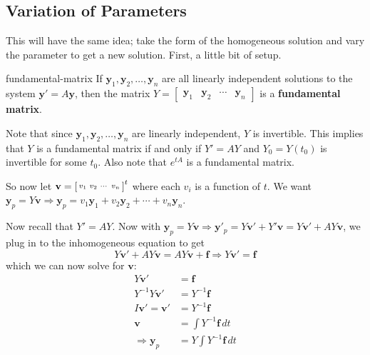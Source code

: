 \documentclass[letterpaper, 11pt, openany]{book}
\theoremstyle{mytheoremstyle}
\theoremstyle{myexamplestyle}
\begin{document}
\subsection{Variation of Parameters}
This will have the same idea; take the form of the homogeneous solution and vary the parameter to get a new solution. First, a little bit of setup.

\begin{definition}{}{fundamental-matrix}
    If \(\mathbf{y}_{1}, \mathbf{y}_{2}, \dots , \mathbf{y}_{n}\) are all linearly independent solutions to the system \(\mathbf{y}' = A \mathbf{y}\), then the matrix \(Y = \begin{bmatrix}\mathbf{y}_{1} & \mathbf{y}_{2} & \cdots & \mathbf{y}_{n} \end{bmatrix}\) is a \textbf{fundamental matrix}.
\end{definition}
Note that since \(\mathbf{y}_{1}, \mathbf{y}_{2}, \dots , \mathbf{y}_{n}\) are linearly independent, \(Y\) is invertible. This implies that \(Y\) is a fundamental matrix if and only if \(Y' = AY\) and \(Y_{0} = Y(t_{0})\) is invertible for some \(t_{0}\). Also note that \(e^{tA}\) is a fundamental matrix.

So now let \(\mathbf{v} = \begin{bsmallmatrix}
    v_{1} & v_{2} & \cdots & v_{n}
\end{bsmallmatrix}^{t}\) where each \(v_{i}\) is a function of \(t\). We want \(\mathbf{y}_{p} = Y \mathbf{v} \Rightarrow \mathbf{y}_{p} = v_{1}\mathbf{y}_{1} + v_{2}\mathbf{y}_{2} + \cdots + v_{n}\mathbf{y}_{n}\).

Now recall that \(Y' = AY\). Now with \(\mathbf{y}_{p} = Y \mathbf{v} \Rightarrow \mathbf{y}'_{p} = Y \mathbf{v}' + Y' \mathbf{v} = Y \mathbf{v}' + AY \mathbf{v}\), we plug in to the inhomogeneous equation to get
\[Y \mathbf{v}' + AY \mathbf{v} = AY \mathbf{v} + \mathbf{f} \Rightarrow Y \mathbf{v}' = \mathbf{f}\]
which we can now solve for \(\mathbf{v}\):
\begin{align*}
    Y \mathbf{v}' &= \mathbf{f}\\
    Y^{-1} Y \mathbf{v}' &= Y^{-1} \mathbf{f}\\
    I \mathbf{v}' = \mathbf{v}' &= Y^{-1} \mathbf{f}\\
    \mathbf{v} &= \int Y^{-1} \mathbf{f} \, dt\\
    \Rightarrow \mathbf{y}_{p} &= Y \int Y^{-1} \mathbf{f} \, dt
\end{align*}
\end{document}
